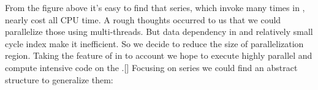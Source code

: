 \documentclass{article}
\begin{document}
\noindent{}From the figure above it's easy to find that  series, which invoke  many times in , nearly cost all CPU time. A rough thoughts occurred to us that we could parallelize those  using multi-threads. But data dependency in  and relatively small cycle index make it inefficient. So we decide to reduce the size of parallelization region. Taking the feature of  in to account we hope to execute highly parallel and compute intensive code on the .[] Focusing on  series we could find an abstract structure to generalize them:%
\end{document}
